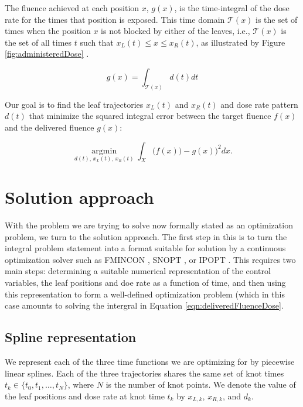 \documentclass[12pt]{article}
\begin{document}
The fluence achieved at each position $x$, $g(x)$, is the time-integral of the dose rate for the times that position is exposed.
This time domain $\mathcal{T}(x)$ is the set of times when the position $x$ is not blocked by either of the leaves, i.e.,
$\mathcal{T}(x)$ is the set of all times $t$ such that $x_L(t) \le x \leq x_R(t)$,
as illustrated by Figure \ref{fig:administeredDose} .

\begin{equation}
g(x) = \int_{\mathcal{T}(x)} d(t) dt
\label{eqn:deliveredFluenceDose}
\end{equation}

Our goal is to find the leaf trajectories $x_L(t)$ and $x_R(t)$ and dose rate pattern $d(t)$
that minimize the squared integral error between the target fluence $f(x)$ and the delivered fluence $g(x)$:

\begin{equation}
\underset{d(t), \, x_L(t), \, x_R(t)}{\operatorname{argmin}}
\int_X \bigg(f(x)) - g(x)\bigg)^2 dx .
\label{eqn:fluenceMapOptimization}
\end{equation}




\section{Solution approach}

With the problem we are trying to solve now formally stated as an optimization problem, we turn
to the solution approach. The first step in this is to turn the integral problem statement into
a format suitable for solution by a continuous optimization solver such as 
FMINCON \cite{MatlabOptimizationToolbox2014}, SNOPT \cite{Snopt7}, or IPOPT \cite{Wachter2006}.
This requires two main steps: determining a suitable numerical representation of the control variables, the leaf positions and doe rate as a function of time, and then using this representation
to form a well-defined optimization problem (which in this case amounts to solving the intergral
in Equation \ref{eqn:deliveredFluenceDose}.

\subsection{Spline representation}

We represent each of the three time functions we are optimizing for
by piecewise linear splines. Each of the three trajectories shares the same set of knot times $t_k \in \{t_0, t_1, \dots, t_N\}$, where $N$ is the number of knot points. We denote the value of the leaf positions and dose rate at knot time $t_k$ by $x_{L,k}$, $x_{R,k}$, and $d_k$. 
\end{document}
